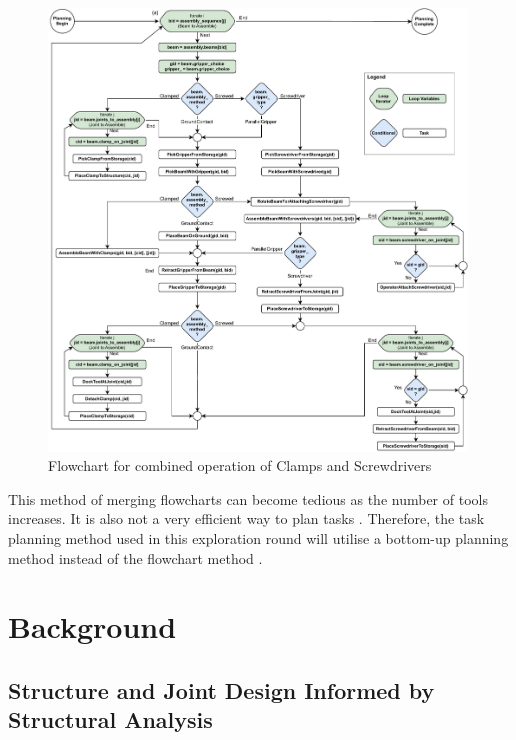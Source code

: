 \begin{figure}[!h]
    \centering
    \includegraphics[width=0.99\textwidth]{images/08/flowchart-3.pdf}
    \caption{Flowchart for combined operation of Clamps and Screwdrivers}
    \label{fig:flowchart-for-combined-operation}
\end{figure}


This method of merging flowcharts can become tedious as the number of tools increases.
It is also not a very efficient way to plan tasks . Therefore, the task planning method used in this exploration round will utilise a bottom-up planning method instead of the flowchart method .

\section{Background}
\label{section:exploration-5-background}

\subsection{Structure and Joint Design Informed by Structural Analysis}
\label{subsection:exploration-5-structure-and-joint-design-informed-by-structural-analysis}

